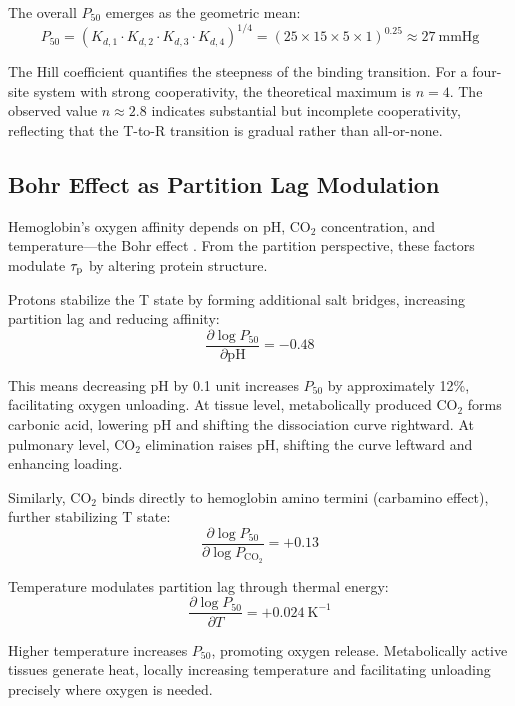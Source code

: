 The overall $P_{50}$ emerges as the geometric mean:
\begin{equation}
P_{50} = (K_{d,1} \cdot K_{d,2} \cdot K_{d,3} \cdot K_{d,4})^{1/4} = (25 \times 15 \times 5 \times 1)^{0.25} \approx 27~\mathrm{mmHg}
\end{equation}

The Hill coefficient quantifies the steepness of the binding transition. For a four-site system with strong cooperativity, the theoretical maximum is $n = 4$. The observed value $n \approx 2.8$ indicates substantial but incomplete cooperativity, reflecting that the T-to-R transition is gradual rather than all-or-none.

\subsection{Bohr Effect as Partition Lag Modulation}

Hemoglobin's oxygen affinity depends on pH, CO$_{2}$ concentration, and temperature—the Bohr effect \cite{bohr1904haemoglobin}. From the partition perspective, these factors modulate $\tau_{\mathrm{p}}$ by altering protein structure.

Protons stabilize the T state by forming additional salt bridges, increasing partition lag and reducing affinity:
\begin{equation}
\frac{\partial \log P_{50}}{\partial \mathrm{pH}} = -0.48
\end{equation}

This means decreasing pH by 0.1 unit increases $P_{50}$ by approximately 12\%, facilitating oxygen unloading. At tissue level, metabolically produced CO$_{2}$ forms carbonic acid, lowering pH and shifting the dissociation curve rightward. At pulmonary level, CO$_{2}$ elimination raises pH, shifting the curve leftward and enhancing loading.

Similarly, CO$_{2}$ binds directly to hemoglobin amino termini (carbamino effect), further stabilizing T state:
\begin{equation}
\frac{\partial \log P_{50}}{\partial \log P_{\mathrm{CO}_{2}}} = +0.13
\end{equation}

Temperature modulates partition lag through thermal energy:
\begin{equation}
\frac{\partial \log P_{50}}{\partial T} = +0.024~\mathrm{K}^{-1}
\end{equation}

Higher temperature increases $P_{50}$, promoting oxygen release. Metabolically active tissues generate heat, locally increasing temperature and facilitating unloading precisely where oxygen is needed.


